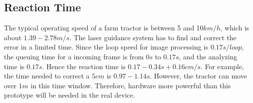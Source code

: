 
\subsection{Reaction Time}

The typical operating speed of a farm tractor is between 5 and 10$km/h$, which is about $1.39-2.78m/s$. The laser guidance system has to find and correct the error in a limited time. Since the loop speed for image processing is $0.17s/loop$, the queuing time for a incoming frame is from $0s$ to $0.17s$, and the analyzing time is $0.17s$. Hence the reaction time is $0.17-0.34s + 0.16cm/s$. For example, the time needed to correct a $5cm$ is $0.97-1.14s$. However, the tractor can move over $1m$ in this time window. Therefore, hardware more powerful than this prototype will be needed in the real device.



